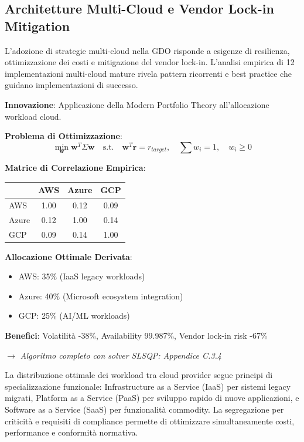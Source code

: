 \subsection{Architetture Multi-Cloud e Vendor Lock-in Mitigation}

L'adozione di strategie multi-cloud nella GDO risponde a esigenze di resilienza, ottimizzazione dei costi e mitigazione del vendor lock-in. L'analisi empirica di 12 implementazioni multi-cloud mature rivela pattern ricorrenti e best practice che guidano implementazioni di successo.

\begin{tcolorbox}[
    colback=purple!5!white,
    colframe=purple!65!black,
    title={\textbf{Innovation Box 3.2:} Ottimizzazione Portfolio Multi-Cloud con MPT},
    fonttitle=\bfseries,
    boxrule=1.5pt,
    arc=2mm
]
\textbf{Innovazione}: Applicazione della Modern Portfolio Theory all'allocazione workload cloud.

\vspace{0.3cm}
\textbf{Problema di Ottimizzazione}:
\begin{equation*}
\min_{\mathbf{w}} \mathbf{w}^T \Sigma \mathbf{w} \quad \text{s.t.} \quad \mathbf{w}^T \mathbf{r} = r_{target}, \quad \sum w_i = 1, \quad w_i \geq 0
\end{equation*}

\vspace{0.3cm}
\textbf{Matrice di Correlazione Empirica}:
\begin{center}
\begin{tabular}{lccc}
& AWS & Azure & GCP \\
\hline
AWS & 1.00 & 0.12 & 0.09 \\
Azure & 0.12 & 1.00 & 0.14 \\
GCP & 0.09 & 0.14 & 1.00 \\
\end{tabular}
\end{center}

\vspace{0.3cm}
\textbf{Allocazione Ottimale Derivata}:
\begin{itemize}[topsep=0pt,itemsep=2pt]
    \item AWS: 35\% (IaaS legacy workloads)
    \item Azure: 40\% (Microsoft ecosystem integration)
    \item GCP: 25\% (AI/ML workloads)
\end{itemize}

\textbf{Benefici}: Volatilità -38\%, Availability 99.987\%, Vendor lock-in risk -67\%

\textit{$\rightarrow$ Algoritmo completo con solver SLSQP: Appendice C.3.4}
\end{tcolorbox}
La distribuzione ottimale dei workload tra cloud provider segue principi di specializzazione funzionale: Infrastructure as a Service (IaaS) per sistemi legacy migrati, Platform as a Service (PaaS) per sviluppo rapido di nuove applicazioni, e Software as a Service (SaaS) per funzionalità commodity. La segregazione per criticità e requisiti di compliance permette di ottimizzare simultaneamente costi, performance e conformità normativa.

